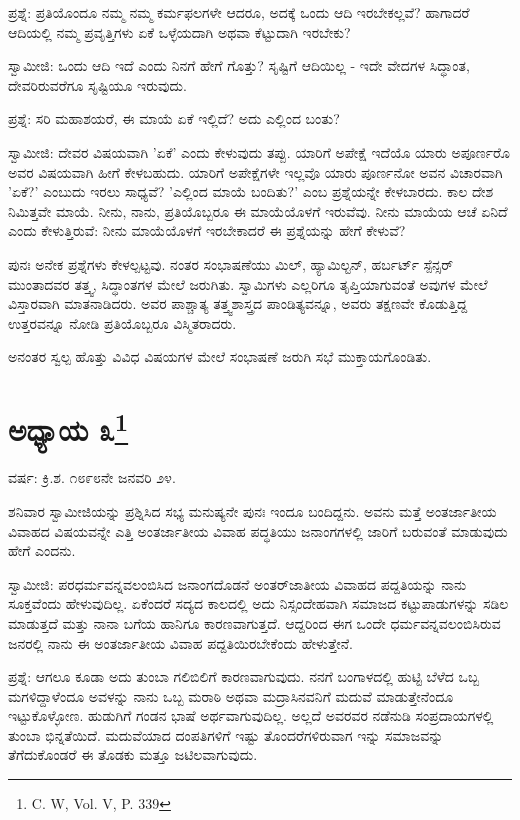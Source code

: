 ಪ್ರಶ್ನೆ: ಪ್ರತಿಯೊಂದೂ ನಮ್ಮ ನಮ್ಮ ಕರ್ಮಫಲಗಳೇ ಆದರೂ, ಅದಕ್ಕೆ ಒಂದು ಆದಿ ಇರಬೇಕಲ್ಲವೆ? ಹಾಗಾದರೆ ಆದಿಯಲ್ಲಿ ನಮ್ಮ ಪ್ರವೃತ್ತಿಗಳು ಏಕೆ ಒಳ್ಳೆಯದಾಗಿ ಅಥವಾ ಕೆಟ್ಟುದಾಗಿ ಇರಬೇಕು?

ಸ್ವಾಮೀಜಿ: ಒಂದು ಆದಿ ಇದೆ ಎಂದು ನಿನಗೆ ಹೇಗೆ ಗೊತ್ತು? ಸೃಷ್ಟಿಗೆ ಆದಿಯಿಲ್ಲ - ಇದೇ ವೇದಗಳ ಸಿದ್ಧಾಂತ, ದೇವರಿರುವರೆಗೂ ಸೃಷ್ಟಿಯೂ ಇರುವುದು.

ಪ್ರಶ್ನೆ: ಸರಿ ಮಹಾಶಯರೆ, ಈ ಮಾಯೆ ಏಕೆ ಇಲ್ಲಿದೆ? ಅದು ಎಲ್ಲಿಂದ ಬಂತು?

ಸ್ವಾಮೀಜಿ: ದೇವರ ವಿಷಯವಾಗಿ 'ಏಕೆ' ಎಂದು ಕೇಳುವುದು ತಪ್ಪು. ಯಾರಿಗೆ ಅಪೇಕ್ಷೆ ಇದೆಯೊ ಯಾರು ಅಪೂರ್ಣರೊ ಅವರ ವಿಷಯವಾಗಿ ಹೀಗೆ ಕೇಳಬಹುದು. ಯಾರಿಗೆ ಅಪೇಕ್ಷೆಗಳೇ ಇಲ್ಲವೊ ಯಾರು ಪೂರ್ಣನೋ ಅವನ ವಿಚಾರವಾಗಿ 'ಏಕೆ?' ಎಂಬುದು ಇರಲು ಸಾಧ್ಯವೆ? 'ಎಲ್ಲಿಂದ ಮಾಯೆ ಬಂದಿತು?' ಎಂಬ ಪ್ರಶ್ನೆಯನ್ನೇ ಕೇಳಬಾರದು. ಕಾಲ ದೇಶ ನಿಮಿತ್ತವೇ ಮಾಯೆ. ನೀನು, ನಾನು, ಪ್ರತಿಯೊಬ್ಬರೂ ಈ ಮಾಯೆಯೊಳಗೆ ಇರುವೆವು. ನೀನು ಮಾಯೆಯ ಆಚೆ ಏನಿದೆ ಎಂದು ಕೇಳುತ್ತಿರುವೆ: ನೀನು ಮಾಯೆಯೊಳಗೆ ಇರಬೇಕಾದರೆ ಈ ಪ್ರಶ್ನೆಯನ್ನು ಹೇಗೆ ಕೇಳುವೆ?

ಪುನಃ ಅನೇಕ ಪ್ರಶ್ನೆಗಳು ಕೇಳಲ್ಪಟ್ಟವು. ನಂತರ ಸಂಭಾಷಣೆಯು ಮಿಲ್, ಹ್ಯಾಮಿಲ್ಟನ್, ಹರ್ಬರ್ಟ್ ಸ್ಪೆನ್ಸರ್ ಮುಂತಾದವರ ತತ್ತ್ವ, ಸಿದ್ಧಾಂತಗಳ ಮೇಲೆ ಜರುಗಿತು. ಸ್ವಾಮಿಗಳು ಎಲ್ಲರಿಗೂ ತೃಪ್ತಿಯಾಗುವಂತೆ ಅವುಗಳ ಮೇಲೆ ವಿಸ್ತಾರವಾಗಿ ಮಾತನಾಡಿದರು. ಅವರ ಪಾಶ್ಚಾತ್ಯ ತತ್ತ್ವಶಾಸ್ತ್ರದ ಪಾಂಡಿತ್ಯವನ್ನೂ, ಅವರು ತಕ್ಷಣವೇ ಕೊಡುತ್ತಿದ್ದ ಉತ್ತರವನ್ನೂ ನೋಡಿ ಪ್ರತಿಯೊಬ್ಬರೂ ವಿಸ್ಮಿತರಾದರು.

ಅನಂತರ ಸ್ವಲ್ಪ ಹೊತ್ತು ವಿವಿಧ ವಿಷಯಗಳ ಮೇಲೆ ಸಂಭಾಷಣೆ ಜರುಗಿ ಸಭೆ ಮುಕ್ತಾಯಗೊಂಡಿತು.

\newpage

\chapter[ಅಧ್ಯಾಯ ೩]{ಅಧ್ಯಾಯ ೩\protect\footnote{\engfoot{} C. W, Vol. V, P. 339}}

\begin{center}
ವರ್ಷ: ಕ್ರಿ.ಶ. ೧೮೯೮ನೇ ಜನವರಿ ೨೪.
\end{center}

ಶನಿವಾರ ಸ್ವಾಮೀಜಿಯನ್ನು ಪ್ರಶ್ನಿಸಿದ ಸಭ್ಯ ಮನುಷ್ಯನೇ ಪುನಃ ಇಂದೂ ಬಂದಿದ್ದನು. ಅವನು ಮತ್ತೆ ಅಂತರ್ಜಾತೀಯ ವಿವಾಹದ ವಿಷಯವನ್ನೇ ಎತ್ತಿ ಅಂತರ್ಜಾತೀಯ ವಿವಾಹ ಪದ್ಧತಿಯು ಜನಾಂಗಗಳಲ್ಲಿ ಜಾರಿಗೆ ಬರುವಂತೆ ಮಾಡುವುದು ಹೇಗೆ ಎಂದನು.

ಸ್ವಾಮೀಜಿ: ಪರಧರ್ಮವನ್ನವಲಂಬಿಸಿದ ಜನಾಂಗದೊಡನೆ ಅಂತರ್‌ಜಾತೀಯ ವಿವಾಹದ ಪದ್ದತಿಯನ್ನು ನಾನು ಸೂಕ್ತವೆಂದು ಹೇಳುವುದಿಲ್ಲ. ಏಕೆಂದರೆ ಸದ್ಯದ ಕಾಲದಲ್ಲಿ ಅದು ನಿಸ್ಸಂದೇಹವಾಗಿ ಸಮಾಜದ ಕಟ್ಟುಪಾಡುಗಳನ್ನು ಸಡಿಲ ಮಾಡುತ್ತದೆ ಮತ್ತು ನಾನಾ ಬಗೆಯ ಹಾನಿಗೂ ಕಾರಣವಾಗುತ್ತದೆ. ಆದ್ದರಿಂದ ಈಗ ಒಂದೇ ಧರ್ಮವನ್ನವಲಂಬಿಸಿರುವ ಜನರಲ್ಲಿ ನಾನು ಈ ಅಂತರ್ಜಾತೀಯ ವಿವಾಹ ಪದ್ದತಿಯಿರಬೇಕೆಂದು ಹೇಳುತ್ತೇನೆ.

ಪ್ರಶ್ನೆ: ಆಗಲೂ ಕೂಡಾ ಅದು ತುಂಬಾ ಗಲಿಬಿಲಿಗೆ ಕಾರಣವಾಗುವುದು. ನನಗೆ ಬಂಗಾಳದಲ್ಲಿ ಹುಟ್ಟಿ ಬೆಳೆದ ಒಬ್ಬ ಮಗಳಿದ್ದಾಳೆಂದೂ ಅವಳನ್ನು ನಾನು ಒಬ್ಬ ಮರಾಠಿ ಅಥವಾ ಮದ್ರಾಸಿನವನಿಗೆ ಮದುವೆ ಮಾಡುತ್ತೇನೆಂದೂ ಇಟ್ಟುಕೊಳ್ಳೋಣ. ಹುಡುಗಿಗೆ ಗಂಡನ ಭಾಷೆ ಅರ್ಥವಾಗುವುದಿಲ್ಲ. ಅಲ್ಲದೆ ಅವರವರ ನಡೆನುಡಿ ಸಂಪ್ರದಾಯಗಳಲ್ಲಿ ತುಂಬಾ ಭಿನ್ನತೆಯಿದೆ. ಮದುವೆಯಾದ ದಂಪತಿಗಳಿಗೆ ಇಷ್ಟು ತೊಂದರೆಗಳಿರುವಾಗ ಇನ್ನು ಸಮಾಜವನ್ನು ತೆಗೆದುಕೊಂಡರೆ ಈ ತೊಡಕು ಮತ್ತೂ ಜಟಿಲವಾಗುವುದು.

